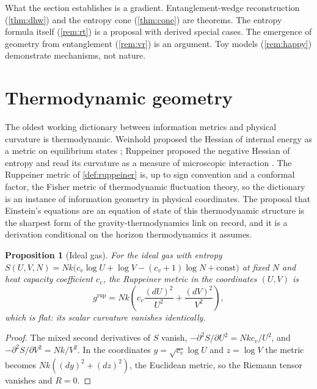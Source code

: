 \documentclass[11pt,letterpaper]{article}
\newtheorem{proposition}[theorem]{Proposition}
\theoremstyle{definition}
\theoremstyle{remark}
\begin{document}
What the section establishes is a gradient. Entanglement-wedge reconstruction (\cref{thm:dhw}) and the entropy cone (\cref{thm:cone}) are theorems. The entropy formula itself (\cref{rem:rt}) is a proposal with derived special cases. The emergence of geometry from entanglement (\cref{rem:vr}) is an argument. Toy models (\cref{rem:happy}) demonstrate mechanisms, not nature.

\section{Thermodynamic geometry}
\label{sec:thermo}

The oldest working dictionary between information metrics and physical curvature is thermodynamic. Weinhold proposed the Hessian of internal energy as a metric on equilibrium states \cite{weinhold}; Ruppeiner proposed the negative Hessian of entropy and read its curvature as a measure of microscopic interaction \cite{ruppeiner}. The Ruppeiner metric of \cref{def:ruppeiner} is, up to sign convention and a conformal factor, the Fisher metric of thermodynamic fluctuation theory, so the dictionary is an instance of information geometry in physical coordinates. The proposal that Einstein's equations are an equation of state of this thermodynamic structure \cite{jacobson} is the sharpest form of the gravity-thermodynamics link on record, and it is a derivation conditional on the horizon thermodynamics it assumes.

\begin{proposition}[Ideal gas]
\label{prop:ideal-gas}
For the ideal gas with entropy $S(U, V, N) = Nk \bigl(c_v \log U + \log V - (c_v + 1) \log N + \text{const}\bigr)$ at fixed $N$ and heat capacity coefficient $c_v$, the Ruppeiner metric in the coordinates $(U, V)$ is
\begin{equation}
g^{\mathrm{rup}} = Nk \left( c_v \frac{(dU)^2}{U^2} + \frac{(dV)^2}{V^2} \right),
\end{equation}
which is flat: its scalar curvature vanishes identically.
\end{proposition}

\begin{proof}
The mixed second derivatives of $S$ vanish, $-\partial^2 S / \partial U^2 = Nk c_v/U^2$, and $-\partial^2 S / \partial V^2 = Nk/V^2$. In the coordinates $y = \sqrt{c_v} \log U$ and $z = \log V$ the metric becomes $Nk ((dy)^2 + (dz)^2)$, the Euclidean metric, so the Riemann tensor vanishes and $R = 0$.
\end{proof}
\end{document}
